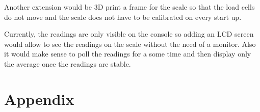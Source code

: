 \documentclass[10pt]{article}
\begin{document}
Another extension would be 3D print a frame for the scale so that the load cells do not move and the scale does not have to be calibrated on every start up.

Currently, the readings are only visible on the console so adding an LCD screen would allow to see the readings on the scale without the need of a monitor. Also it would make sense to poll the readings for a some time and then display only the average once the readings are stable.

\newpage
\section{Appendix}


\end{document}
